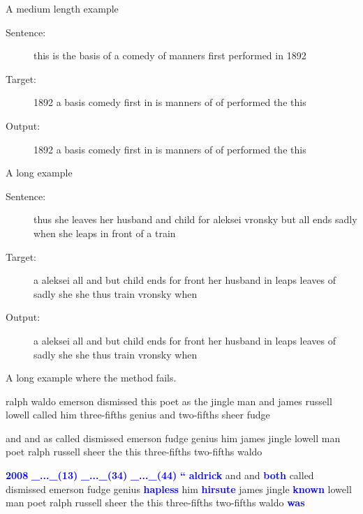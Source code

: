 \documentclass[]{beamer}
\begin{document}
\begin{frame}{A medium length example}
	\begin{description}
		\item[Sentence:] this is the basis of a comedy of manners first performed in 1892
		\item[Target:] 1892 a   basis   comedy  first   in  is  manners of  of  performed   the this
		\item[Output:] 1892 a   basis   comedy  first   in  is  manners of  of  performed   the this        
	\end{description}
\end{frame}


\begin{frame}{A long example}
	\begin{description}
		\item[Sentence:] thus she leaves her husband and child for aleksei vronsky but all ends sadly when she leaps in front of a train
		\item[Target:] a    aleksei all and but child   ends    for front   her husband in  leaps   leaves  of  sadly   she she thus    train   vronsky when
		\item[Output:] a    aleksei all and but child   ends    for front   her husband in  leaps   leaves  of  sadly   she she thus    train   vronsky when
	\end{description}
\end{frame}

\begin{frame}[fragile]{A long example where the method fails.}
	\begin{description}
		\let\oldtextbf\textbf
		\renewcommand{\textbf}[1]{\textcolor{blue}{\oldtextbf{#1}}}
		\renewcommand{\emph}[1]{\textcolor{red}{\cancel{#1}}} %
		\item[Sentence:] ralph waldo emerson dismissed this poet as the jingle man and james russell lowell called him three-fifths genius and two-fifths sheer fudge
		\item[Target:] and  and  as  called  dismissed  emerson  fudge  genius  him  james  jingle  lowell  man  poet  ralph  russell  sheer  the  this  three-fifths  two-fifths  waldo
		\item[Output:] \textbf{2008}   \textbf{\_...\_(13)}   \textbf{\_...\_(34)}   \textbf{\_...\_(44)}  \textbf{``}   \textbf{aldrick}   and and  \emph{as}   \textbf{both}   called   dismissed   emerson   fudge   genius   \textbf{hapless}   him   \textbf{hirsute}   james   jingle   \textbf{known}   lowell   man   poet   ralph   russell   sheer   the   this   three-fifths   two-fifths   waldo   \textbf{was}   
	\end{description}
\end{frame}
\end{document}
